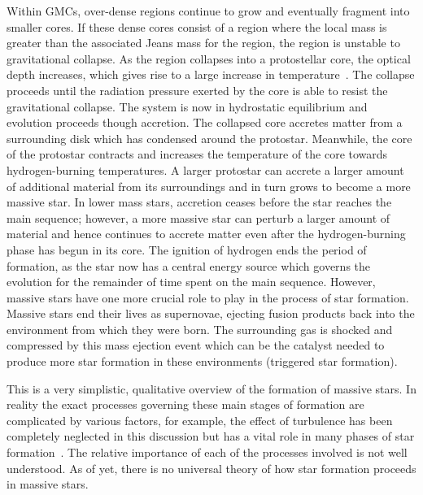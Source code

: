 Within GMCs, over-dense regions continue to grow and eventually fragment into smaller cores.
If these dense cores consist of a region where the local mass is greater than the associated Jeans mass for the region, the region is unstable to gravitational collapse.
As the region collapses into a protostellar core, the optical depth increases, which gives rise to a large increase in temperature~\citep{Zinnecker07}.
The collapse proceeds until the radiation pressure exerted by the core is able to resist the gravitational collapse.
The system is now in hydrostatic equilibrium and evolution proceeds though accretion.
The collapsed core accretes matter from a surrounding disk which has condensed around the protostar.
Meanwhile, the core of the protostar contracts and increases the temperature of the core towards hydrogen-burning temperatures.
A larger protostar can accrete a larger amount of additional material from its surroundings and in turn grows to become a more massive star.
In lower mass stars, accretion ceases before the star reaches the main sequence; however, a more massive star can perturb a larger amount of material and hence continues to accrete matter even after the hydrogen-burning phase has begun in its core.
The ignition of hydrogen ends the period of formation, as the star now has a central energy source which governs the evolution for the remainder of time spent on the main sequence.
However, massive stars have one more crucial role to play in the process of star formation.
Massive stars end their lives as supernovae, ejecting fusion products back into the environment from which they were born.
The surrounding gas is shocked and compressed by this mass ejection event which can be the catalyst needed to produce more star formation in these environments (triggered star formation).

This is a very simplistic, qualitative overview of the formation of massive stars.
In reality the exact processes governing these main stages of formation are complicated by various factors, for example, the effect of turbulence has been completely neglected in this discussion but has a vital role in many phases of star formation~\citep{McKee07}.
The relative importance of each of the processes involved is not well understood.
As of yet, there is no universal theory of how star formation proceeds in massive stars.

